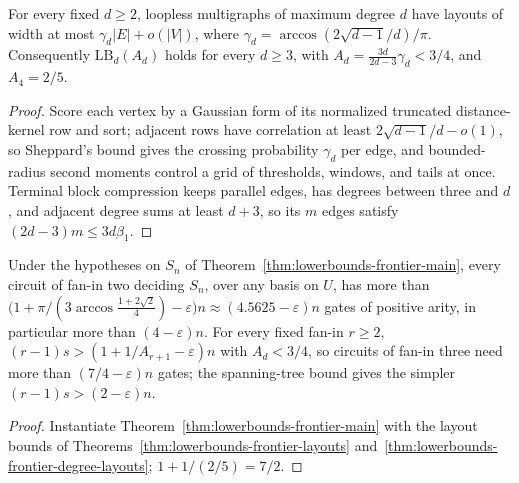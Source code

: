 \begin{theorem}
  \label{thm:lowerbounds-frontier-degree-layouts}
  \leanok
  For every fixed $d\ge2$, loopless multigraphs of maximum degree $d$ have layouts
  of width at most $\gamma_d|E|+o(|V|)$, where
  $\gamma_d=\arccos(2\sqrt{d-1}/d)/\pi$. Consequently $\mathrm{LB}_d(A_d)$ holds for
  every $d\ge3$, with $A_d=\tfrac{3d}{2d-3}\gamma_d<3/4$, and $A_4=2/5$.
\end{theorem}
\begin{proof}
  \leanok
  Score each vertex by a Gaussian form of its normalized truncated distance-kernel
  row and sort; adjacent rows have correlation at least $2\sqrt{d-1}/d-o(1)$, so
  Sheppard's bound gives the crossing probability $\gamma_d$ per edge, and
  bounded-radius second moments control a grid of thresholds, windows, and tails
  at once. Terminal block compression keeps parallel edges, has degrees between
  three and $d$, and adjacent degree sums at least $d+3$, so its $m$ edges satisfy
  $(2d-3)m\le3d\beta_1$.
\end{proof}

\begin{theorem}
  \label{thm:lowerbounds-frontier-unconditional}
  \leanok
  Under the hypotheses on $S_n$ of Theorem~\ref{thm:lowerbounds-frontier-main},
  every circuit of fan-in two deciding $S_n$, over any basis on $U$, has more
  than $\bigl(1+\pi/(3\arccos\tfrac{1+2\sqrt2}{4})-\varepsilon\bigr)n\approx
  (4.5625-\varepsilon)n$ gates of positive arity, in particular more than
  $(4-\varepsilon)n$. For every fixed fan-in $r\ge2$,
  $(r-1)s>(1+1/A_{r+1}-\varepsilon)n$ with $A_d<3/4$, so circuits of fan-in three
  need more than $(7/4-\varepsilon)n$ gates; the spanning-tree bound gives the
  simpler $(r-1)s>(2-\varepsilon)n$.
\end{theorem}
\begin{proof}
  \leanok
  Instantiate Theorem~\ref{thm:lowerbounds-frontier-main} with the layout
  bounds of Theorems~\ref{thm:lowerbounds-frontier-layouts}
  and~\ref{thm:lowerbounds-frontier-degree-layouts}; $1+1/(2/5)=7/2$.
\end{proof}

